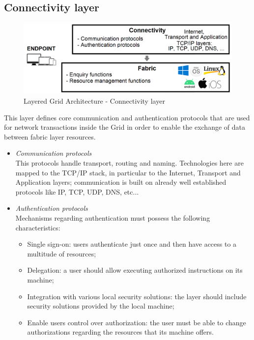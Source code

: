 \subsection{Connectivity layer}\label{connectivity_layer}
\begin{figure}[!ht]
    \centering
    \includegraphics[scale=0.35]{document/chapters/chapter_2/images/connectivity_layer.png}
    \caption{Layered Grid Architecture - Connectivity layer}
    \label{fig:connectivity_layer}
\end{figure}
\vspace{5mm}

\noindent This layer defines core communication and authentication protocols that are used for network transactions inside the Grid in order to enable the exchange of data between fabric layer resources.
\begin{itemize}
    \item \textit{Communication protocols}\\
    This protocols handle transport, routing and naming. Technologies here are mapped to the TCP/IP stack, in particular to the Internet, Transport and Application layers; communication is built on already well established protocols like IP, TCP, UDP, DNS, etc... 
    \item \textit{Authentication protocols}\\
    Mechanisms regarding authentication must possess the following characteristics:
    \begin{itemize}
        \item Single sign-on: users authenticate just once and then have access to a multitude of resources;
        \item Delegation: a user should allow executing authorized instructions on its machine; 
        \item Integration with various local security solutions: the layer should include security solutions provided by the local machine;
        \item Enable users control over authorization: the user must be able to change authorizations regarding the resources that its machine offers.
    \end{itemize}
\end{itemize}

